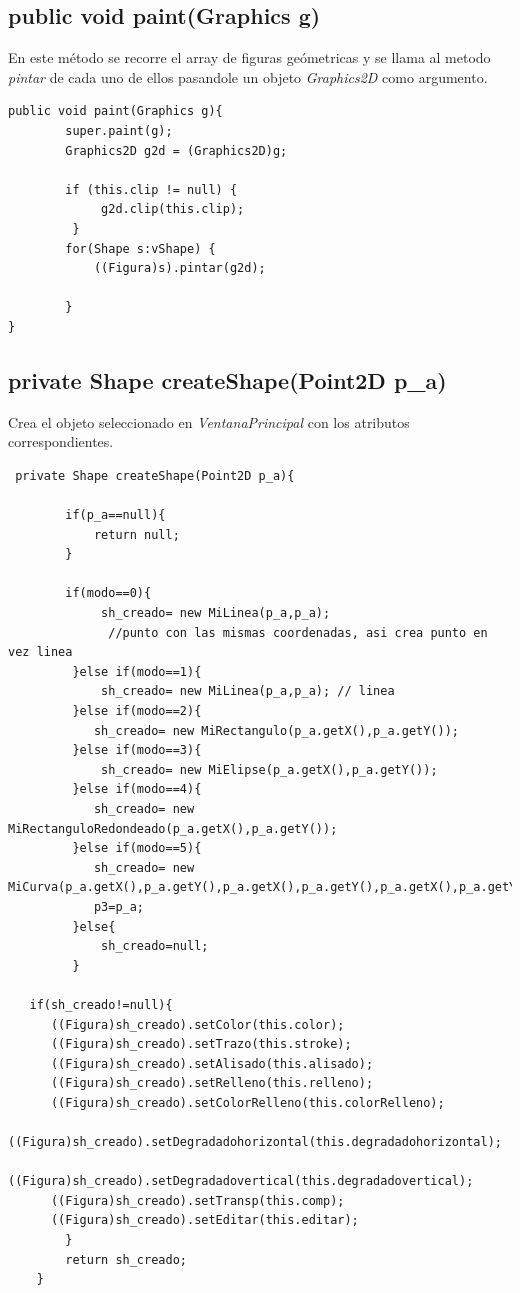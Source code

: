\subsection*{public void paint(Graphics g)}
En este método se recorre el array de figuras geómetricas y se llama al metodo \emph{pintar} de cada uno de ellos pasandole un objeto \emph{Graphics2D} como argumento.
\begin{lstlisting}
public void paint(Graphics g){
        super.paint(g);
        Graphics2D g2d = (Graphics2D)g;
        
        if (this.clip != null) {
             g2d.clip(this.clip);
         }
        for(Shape s:vShape) {
            ((Figura)s).pintar(g2d);
                        
        }
}
\end{lstlisting}

\subsection*{private Shape createShape(Point2D p\_a)}
Crea el objeto seleccionado en \emph{VentanaPrincipal} con los atributos correspondientes.
\begin{lstlisting}
 private Shape createShape(Point2D p_a){
     
        if(p_a==null){
            return null;
        }
      
        if(modo==0){
             sh_creado= new MiLinea(p_a,p_a);
              //punto con las mismas coordenadas, asi crea punto en vez linea           
         }else if(modo==1){
             sh_creado= new MiLinea(p_a,p_a); // linea           
         }else if(modo==2){  
            sh_creado= new MiRectangulo(p_a.getX(),p_a.getY());
         }else if(modo==3){ 
             sh_creado= new MiElipse(p_a.getX(),p_a.getY());
         }else if(modo==4){  
            sh_creado= new MiRectanguloRedondeado(p_a.getX(),p_a.getY());   
         }else if(modo==5){  
            sh_creado= new MiCurva(p_a.getX(),p_a.getY(),p_a.getX(),p_a.getY(),p_a.getX(),p_a.getY());  
            p3=p_a;
         }else{      
             sh_creado=null;
         }
        
   if(sh_creado!=null){
      ((Figura)sh_creado).setColor(this.color);
      ((Figura)sh_creado).setTrazo(this.stroke);
      ((Figura)sh_creado).setAlisado(this.alisado);
      ((Figura)sh_creado).setRelleno(this.relleno);
      ((Figura)sh_creado).setColorRelleno(this.colorRelleno);
      ((Figura)sh_creado).setDegradadohorizontal(this.degradadohorizontal);
      ((Figura)sh_creado).setDegradadovertical(this.degradadovertical);
      ((Figura)sh_creado).setTransp(this.comp);
      ((Figura)sh_creado).setEditar(this.editar);
        }
        return sh_creado;
    }
\end{lstlisting}

